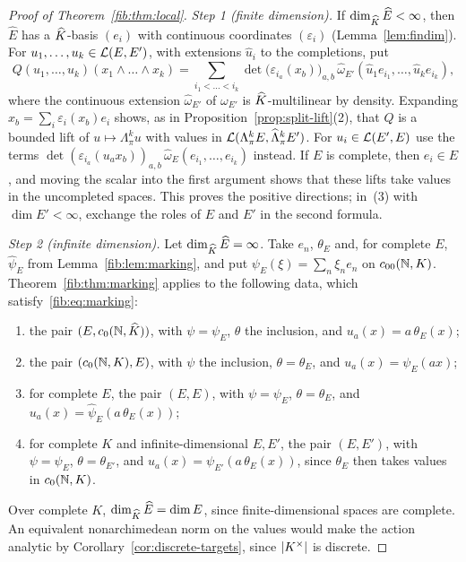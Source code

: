 \begin{proof}[Proof of Theorem~\ref{fib:thm:local}]
\emph{Step 1 (finite dimension).} If $\dim_{\widehat K}\widehat E<\infty$, then $\widehat E$ has a $\widehat K$\nobreakdash-basis
$(e_i)$ with continuous coordinates $(\varepsilon_i)$ (Lemma~\ref{lem:findim}). For $u_1,\dots,u_k\in\mathcal L(E,E')$, with
extensions $\widehat u_i$ to the completions, put
\[
 Q(u_1,\dots,u_k)(x_1\wedge\dots\wedge x_k)=\sum_{i_1<\dots<i_k}\det\bigl(\varepsilon_{i_a}(x_b)\bigr)_{a,b}\,
 \widehat\omega_{E'}(\widehat u_1e_{i_1},\dots,\widehat u_ke_{i_k}),
\]
where the continuous extension $\widehat\omega_{E'}$ of $\omega_{E'}$ is $\widehat K$\nobreakdash-multilinear by density.
Expanding $x_b=\sum_i\varepsilon_i(x_b)e_i$ shows, as in Proposition~\ref{prop:split-lift}(2), that $Q$ is a bounded lift
of $u\mapsto\Lambda^k_\pi u$ with values in $\mathcal L(\Lambda^k_\pi E,\widehat\Lambda^k_\pi E')$. For $u_i\in\mathcal L(E',E)$ use the
terms $\det(\varepsilon_{i_a}(u_ax_b))_{a,b}\,\widehat\omega_E(e_{i_1},\dots,e_{i_k})$ instead. If $E$ is complete, then
$e_i\in E$, and moving the scalar into the first argument shows that these lifts take values in the uncompleted spaces.
This proves the positive directions; in~(3) with $\dim E'<\infty$, exchange the roles of $E$ and $E'$ in the second
formula.

\emph{Step 2 (infinite dimension).} Let $\dim_{\widehat K}\widehat E=\infty$. Take $e_n$, $\theta_E$ and, for complete $E$,
$\widehat\psi_E$ from Lemma~\ref{fib:lem:marking}, and put $\psi_E(\xi)=\sum_n\xi_ne_n$ on $c_{00}(\mathbb N,K)$.
Theorem~\ref{fib:thm:marking} applies to the following data, which satisfy~\eqref{fib:eq:marking}:
\begin{enumerate}
\item[(a)] the pair $(E,c_0(\mathbb N,\widehat K))$, with $\psi=\psi_E$, $\theta$ the inclusion, and $u_a(x)=a\,\theta_E(x)$;
\item[(b)] the pair $(c_0(\mathbb N,K),E)$, with $\psi$ the inclusion, $\theta=\theta_E$, and $u_a(x)=\psi_E(ax)$;
\item[(c)] for complete $E$, the pair $(E,E)$, with $\psi=\psi_E$, $\theta=\theta_E$, and
$u_a(x)=\widehat\psi_E(a\,\theta_E(x))$;
\item[(d)] for complete $K$ and infinite-dimensional $E,E'$, the pair $(E,E')$, with $\psi=\psi_E$,
$\theta=\theta_{E'}$, and $u_a(x)=\psi_{E'}(a\,\theta_E(x))$, since $\theta_E$ then takes values in $c_0(\mathbb N,K)$.
\end{enumerate}
Over complete $K$, $\dim_{\widehat K}\widehat E=\dim E$, since finite-dimensional spaces are complete. An equivalent
nonarchimedean norm on the values would make the action analytic by Corollary~\ref{cor:discrete-targets}, since
$\lvert K^\times\rvert$ is discrete.
\end{proof}

